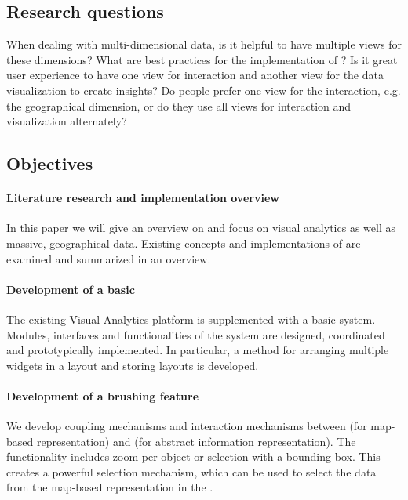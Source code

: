 \documentclass{article}
\begin{document}
\subsection{Research questions}

When dealing with multi-dimensional data, is it helpful to have multiple views for these dimensions?
What are best practices for the implementation of \cmvs{}?
Is it great user experience to have one view for interaction and another view for the data visualization to create insights?
Do people prefer one view for the interaction, e.g. the geographical dimension, or do they use all views for interaction and visualization alternately?

\subsection{Objectives}


\paragraph{Literature research and implementation overview}
In this paper we will give an overview on \cmvs{} and focus on visual analytics as well as massive, geographical data.
Existing concepts and implementations of \cmvs{} are examined and summarized in an overview.

\paragraph{Development of a basic \cmv{}}
The existing Visual Analytics platform is supplemented with a basic \cmv{} system.
Modules, interfaces and functionalities of the \cmv{} system are designed, coordinated and prototypically implemented.
In particular, a method for arranging multiple \cmv{} widgets in a \cmv{} layout and storing \cmv{} layouts is developed.

\paragraph{Development of a brushing feature}
We develop coupling mechanisms and interaction mechanisms between \maps{} (for map-based representation) and \tmaps{} (for abstract information representation).
The functionality includes zoom per object or selection with a bounding box.
This creates a powerful selection mechanism, which can be used to select the data from the map-based representation in the \tmap{}.
\end{document}
